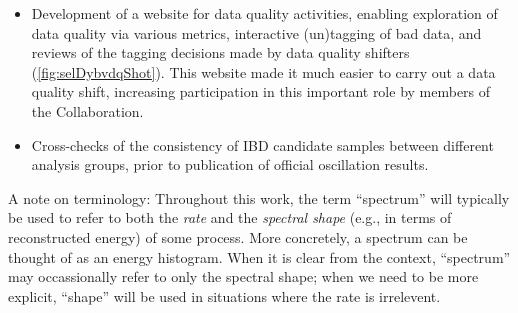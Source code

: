 \documentclass[../thesis.tex]{subfiles}
\begin{document}
\begin{itemize}
\item Development of a website \cite{dybvdq} for data quality activities, enabling exploration of data quality via various metrics, interactive (un)tagging of bad data, and reviews of the tagging decisions made by data quality shifters (\autoref{fig:selDybvdqShot}). This website made it much easier to carry out a data quality shift, increasing participation in this important role by members of the Collaboration.
\item Cross-checks of the consistency of IBD candidate samples between different analysis groups, prior to publication of official oscillation results.
\end{itemize}

A note on terminology: Throughout this work, the term ``spectrum'' will typically be used to refer to both the \emph{rate} and the \emph{spectral shape} (e.g., in terms of reconstructed energy) of some process. More concretely, a spectrum can be thought of as an energy histogram. When it is clear from the context, ``spectrum'' may occassionally refer to only the spectral shape; when we need to be more explicit, ``shape'' will be used in situations where the rate is irrelevent.
\end{document}
